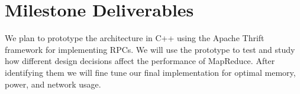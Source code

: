 \documentclass[10pt,letter,final,article,twocolumn]{article} %
\begin{document}
\section{Milestone Deliverables}
We plan to prototype the architecture in C++ using the Apache Thrift framework for implementing RPCs. We will use the prototype to test and study how different design decisions affect the performance of MapReduce. After identifying them we will fine tune our final implementation for optimal memory, power, and network usage.




\end{document}
